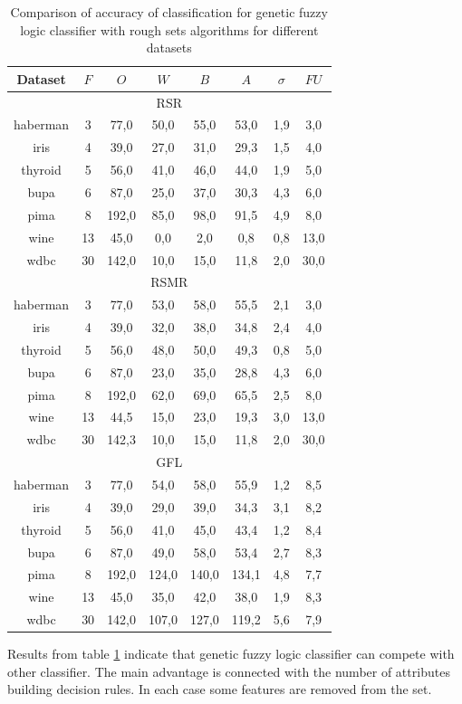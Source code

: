 \begin{table}[H]
    \caption{Comparison of accuracy of classification for genetic fuzzy logic classifier with
    rough sets algorithms for different datasets}
    \centering
    \begin{tabular}{|c|c|c|c|c|c|c|c|}
        \hline
        Dataset&$F$&$O$&$W$&$B$&$A$&$\sigma$&$FU$\\ \hline \hline
        \multicolumn{8}{|c|}{RSR}\\ \hline
        haberman&3&77,0&50,0&55,0&53,0&1,9&3,0\\ \hline
        iris&4&39,0&27,0&31,0&29,3&1,5&4,0\\ \hline
        thyroid&5&56,0&41,0&46,0&44,0&1,9&5,0\\ \hline
        bupa&6&87,0&25,0&37,0&30,3&4,3&6,0\\ \hline
        pima&8&192,0&85,0&98,0&91,5&4,9&8,0\\ \hline
        wine&13&45,0&0,0&2,0&0,8&0,8&13,0\\ \hline
        wdbc&30&142,0&10,0&15,0&11,8&2,0&30,0\\ \hline \hline

        \multicolumn{8}{|c|}{RSMR}\\ \hline
        haberman&3&77,0&53,0&58,0&55,5&2,1&3,0\\ \hline
        iris&4&39,0&32,0&38,0&34,8&2,4&4,0\\ \hline
        thyroid&5&56,0&48,0&50,0&49,3&0,8&5,0\\ \hline
        bupa&6&87,0&23,0&35,0&28,8&4,3&6,0\\ \hline
        pima&8&192,0&62,0&69,0&65,5&2,5&8,0\\ \hline
        wine&13&44,5&15,0&23,0&19,3&3,0&13,0\\ \hline
        wdbc&30&142,3&10,0&15,0&11,8&2,0&30,0\\ \hline \hline

        \multicolumn{8}{|c|}{GFL}\\ \hline
        haberman&3&77,0&54,0&58,0&55,9&1,2&8,5\\ \hline
        iris&4&39,0&29,0&39,0&34,3&3,1&8,2\\ \hline
        thyroid&5&56,0&41,0&45,0&43,4&1,2&8,4\\ \hline
        bupa&6&87,0&49,0&58,0&53,4&2,7&8,3\\ \hline
        pima&8&192,0&124,0&140,0&134,1&4,8&7,7\\ \hline
        wine&13&45,0&35,0&42,0&38,0&1,9&8,3\\ \hline
        wdbc&30&142,0&107,0&127,0&119,2&5,6&7,9\\ \hline
    \end{tabular}
    \label{tab:genetic_fuzzy_results}
\end{table}
Results from table \ref{tab:genetic_fuzzy_results} indicate that genetic fuzzy
logic classifier can compete with other classifier. The main advantage is
connected with the number of attributes building decision rules. In each case
some features are removed from the set.

